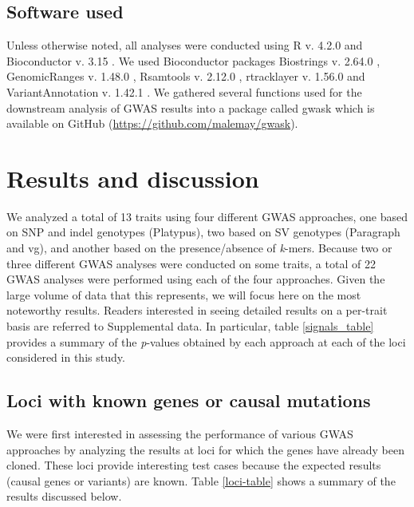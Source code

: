\subsection*{Software used}
\label{sv-gwas-software-used}

Unless otherwise noted, all analyses were conducted using R v. 4.2.0
\citep{r2022} and Bioconductor v. 3.15 \citep{huber2015}. We used Bioconductor
packages Biostrings v. 2.64.0 \citep{pages2022}, GenomicRanges v. 1.48.0
\citep{lawrence2013}, Rsamtools v. 2.12.0 \citep{rsamtools2022}, rtracklayer v.
1.56.0 \citep{lawrence2009} and VariantAnnotation v. 1.42.1
\citep{obenchain2014}.  We gathered several functions used for the downstream
analysis of GWAS results into a package called gwask which is available on
GitHub (\url{https://github.com/malemay/gwask}).

\section*{Results and discussion}
\label{sv-gwas-results-discussion}

We analyzed a total of 13 traits using four different GWAS approaches, one
based on SNP and indel genotypes (Platypus), two based on SV genotypes (Paragraph and
vg), and another based on the presence/absence of \textit{k}-mers.
Because two or three different GWAS analyses were conducted on some traits, a
total of 22 GWAS analyses were performed using each of the four approaches.
Given the large volume of data that this represents, we will focus here on the
most noteworthy results. Readers interested in seeing detailed results on a
per-trait basis are referred to
Supplemental data. In particular, table \ref{signals_table}
provides a summary of the \textit{p}-values obtained by each approach at each
of the loci considered in this study.

\subsection*{Loci with known genes or causal mutations}
\label{sv-gwas-results-cloned-genes}

We were first interested in assessing the performance of various GWAS
approaches by analyzing the results at loci for which the genes have
already been cloned. These loci provide interesting test cases because
the expected results (causal genes or variants) are known. Table \ref{loci-table} shows
a summary of the results discussed below.

